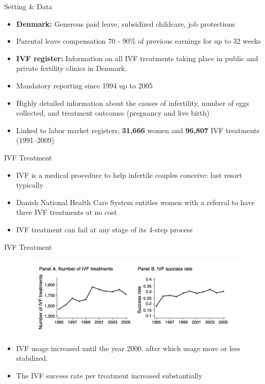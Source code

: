 \documentclass[11pt,notes=hide,aspectratio=169,mathserif]{beamer}
\begin{document}
\begin{frame}{Setting \& Data}
\small
\begin{itemize}
  \item \textbf{Denmark:} Generous paid leave, subsidized childcare, job protections
  \item Parental leave compensation 70 - 90\% of previous earnings for up to 32 weeks 
  \item \textbf{IVF register:}  Information on all IVF treatments taking place in public and private fertility clinics in Denmark.
  \item Mandatory reporting since 1994 up to 2005
  \item Highly detailed information about the causes of infertility, number of eggs collected, and treatment outcomes (pregnancy and live birth)
  \item Linked to labor market registers, \textbf{31,666} women and \textbf{96,807} IVF treatments (1991–2009)
\end{itemize}
\end{frame}

\begin{frame}{IVF Treatment}
\small
\begin{itemize}
  \item IVF is a medical procedure to help infertile couples conceive: last resort typically 
  \item Danish National Health Care System entitles women with a referral to have three IVF treatments at no cost
  \item IVF treatment can fail at any stage of its 4-step process 
\end{itemize}
\end{frame}

\begin{frame}{IVF Treatment}
\begin{figure}
\centering
\includegraphics[width=1.0\linewidth]{inputs/ivf1.png}
\end{figure}
\begin{itemize}
  \item IVF usage increased until the year
  2000, after which usage more or less stabilized.
  \item  The IVF success rate per
  treatment increased substantially
  \end{itemize}
\end{frame}
\end{document}
